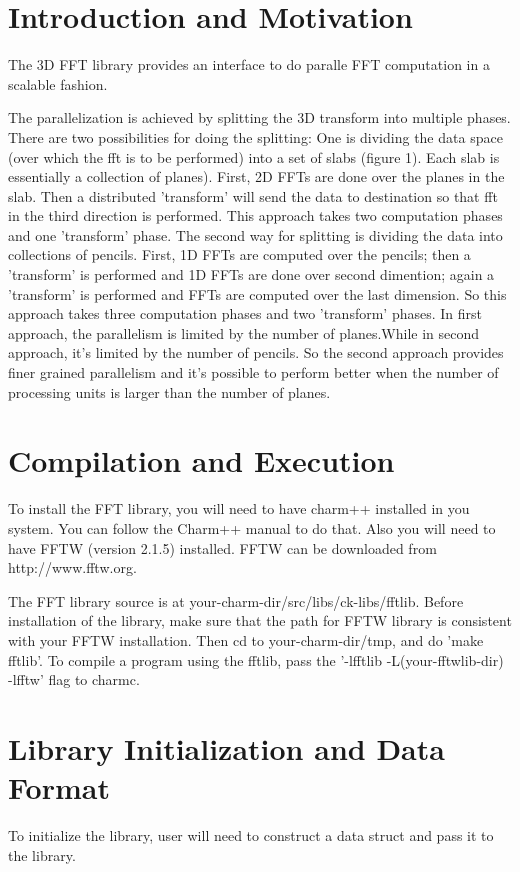 
\section{Introduction and Motivation}
The 3D FFT library provides an interface to do paralle FFT computation
in a scalable fashion. 

The parallelization is achieved by splitting the 3D transform into
multiple phases. There are two possibilities for doing the splitting:
One is dividing the data space (over which the fft is to be performed)
into a set of slabs (figure 1). Each slab is essentially a collection
of planes). First, 2D FFTs are done over the planes in the slab. Then
a distributed 'transform' will send the data to destination so that
fft in the third direction is performed. This approach takes two
computation phases and one 'transform' phase. The second way for
splitting is dividing the data into collections of pencils. First, 1D
FFTs are computed over the pencils; then a 'transform' is performed
and 1D FFTs are done over second dimention; again a 'transform' is
performed and FFTs are computed over the last dimension. So this
approach takes three computation phases and two 'transform' phases. In
first approach, the parallelism is limited by the number of
planes.While in second approach, it's limited by the number of
pencils. So the second approach provides finer grained parallelism and
it's possible to perform better when the number of processing units is
larger than the number of planes.

\section{Compilation and Execution}

To install the FFT library, you will need to have charm++ installed in
you system. You can follow the Charm++ manual to do that. Also you
will need to have FFTW (version 2.1.5) installed. FFTW can be
downloaded from http://www.fftw.org.

The FFT library source is at
your-charm-dir/src/libs/ck-libs/fftlib. Before installation of the
library, make sure that the path for FFTW library is consistent with
your FFTW installation. Then cd to your-charm-dir/tmp, and do 'make
fftlib'. To compile a program using the fftlib, pass the '-lfftlib
-L(your-fftwlib-dir) -lfftw' flag to charmc.

\section{Library Initialization and Data Format} 
To initialize the library, user will need to construct a data struct and pass it to the library. 

